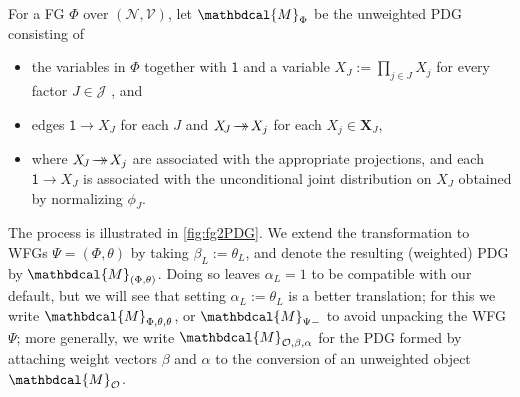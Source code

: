 \documentclass[letterpaper]{article} %
\theoremstyle{plain}
\theoremstyle{definition}
\theoremstyle{remark}
\newcommand{\valpha}[1]{{\color{red!80!black}#1}}
\newcommand\mat[1]{\mathbf{#1}}
\newcommand{\tto}{\rightarrow\mathrel{\mspace{-15mu}}\rightarrow}
\newcommand{\dg}[1]{\mathbdcal{#1}}
\newcommand{\var}[1]{\mathsf{#1}}
\newcommand{\bp}[1][L]{\mat{p}_{\!_{#1}\!}}
\newcommand{\V}{\mathcal V}
\newcommand{\N}{\mathcal N}
\newcommand{\nvvars}[1][\N,\V]{(#1)}
\newcommand{\PDGof}[1]{{\dg M}_{#1}}
\begin{document}
\begin{defn}[FG to PDG] \label{def:fg2PDG}
	For a FG $\Phi$ over $\nvvars$, let $\PDGof{\Phi}$ be
	the unweighted PDG consisting of
\begin{itemize}
	\item the variables in $\Phi$ together
   with $\var 1$ and a variable $X_{\!J} := \prod_{j \in J} X_j$ for every factor $J \in \mathcal J$%
   , and
   \item edges ${\var 1} \!\to\! X_{\!J}$ for each $J$ and $X_{\!J} \!\tto\! X_j$ for each $X_j \in \mat X_J$,
   \item where $ X_{\!J} \!\tto\! X_j$ are associated with the appropriate projections, and each ${\var 1} \!\to\! X_{\!J}$ is associated with the unconditional joint distribution on $X_J$
    obtained by normalizing $\phi_J$. %
\end{itemize}
The process is illustrated in \cref{fig:fg2PDG}.
We extend the transformation to WFGs $\Psi=(\Phi, \theta)$ by taking $\beta_L := \theta_L$, and denote the resulting (weighted) PDG by $\PDGof{(\Phi, \theta)}$.
\valpha{Doing so leaves $\alpha_L=1$ to be compatible with our default, but we will see that setting $\alpha_L := \theta_L$ is a better translation; for this we write $\PDGof{\Phi, \theta, \theta}$, or $\PDGof{\Psi -}$ 
to avoid unpacking the WFG $\Psi$; 
more generally, we write $\PDGof{\mathcal O,\beta,\alpha}$ for the PDG formed by attaching weight vectors $\beta$ and $\alpha$ to the conversion of an unweighted object $\PDGof{\mathcal O}$.}
\end{defn}
\end{document}
